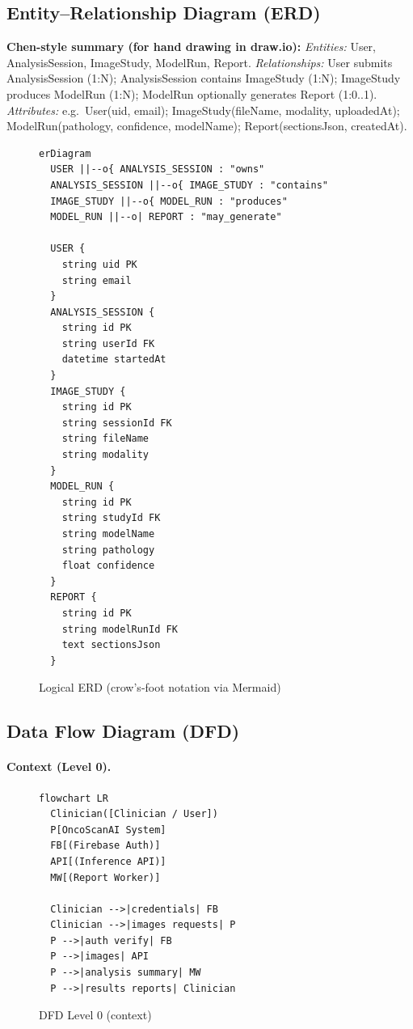 \subsection{Entity--Relationship Diagram (ERD)}
\label{sec:erd}

\textbf{Chen-style summary (for hand drawing in draw.io):}
\textit{Entities:} User, AnalysisSession, ImageStudy, ModelRun, Report.
\textit{Relationships:} User submits AnalysisSession (1:N); AnalysisSession contains ImageStudy (1:N); ImageStudy produces ModelRun (1:N); ModelRun optionally generates Report (1:0..1).
\textit{Attributes:} e.g.\ User(uid, email); ImageStudy(fileName, modality, uploadedAt); ModelRun(pathology, confidence, modelName); Report(sectionsJson, createdAt).

\begin{figure}[htbp]
  \centering
  \begin{minipage}{0.92\textwidth}
  \begin{lstlisting}
erDiagram
  USER ||--o{ ANALYSIS_SESSION : "owns"
  ANALYSIS_SESSION ||--o{ IMAGE_STUDY : "contains"
  IMAGE_STUDY ||--o{ MODEL_RUN : "produces"
  MODEL_RUN ||--o| REPORT : "may_generate"

  USER {
    string uid PK
    string email
  }
  ANALYSIS_SESSION {
    string id PK
    string userId FK
    datetime startedAt
  }
  IMAGE_STUDY {
    string id PK
    string sessionId FK
    string fileName
    string modality
  }
  MODEL_RUN {
    string id PK
    string studyId FK
    string modelName
    string pathology
    float confidence
  }
  REPORT {
    string id PK
    string modelRunId FK
    text sectionsJson
  }
  \end{lstlisting}
  \end{minipage}
  \caption{Logical ERD (crow's-foot notation via Mermaid)}
\end{figure}

\subsection{Data Flow Diagram (DFD)}
\label{sec:dfd}

\paragraph{Context (Level 0).}

\begin{figure}[htbp]
  \centering
  \begin{minipage}{0.92\textwidth}
  \begin{lstlisting}
flowchart LR
  Clinician([Clinician / User])
  P[OncoScanAI System]
  FB[(Firebase Auth)]
  API[(Inference API)]
  MW[(Report Worker)]

  Clinician -->|credentials| FB
  Clinician -->|images requests| P
  P -->|auth verify| FB
  P -->|images| API
  P -->|analysis summary| MW
  P -->|results reports| Clinician
  \end{lstlisting}
  \end{minipage}
  \caption{DFD Level 0 (context)}
\end{figure}

